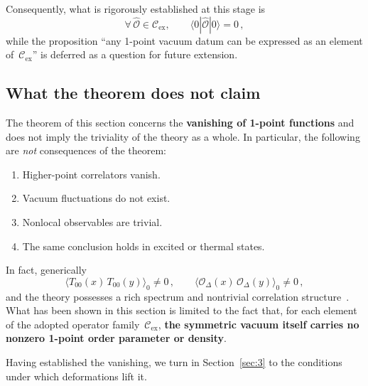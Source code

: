 \documentclass[
  aps,
  prd,
  preprint,
  groupedaddress,
  nofootinbib,
  longbibliography
]{revtex4-2}
\theoremstyle{remark}
\newcommand{\Cex}{\mathcal{C}_{\mathrm{ex}}}
\begin{document}
Consequently, what is rigorously established at this stage is
\begin{equation}\label{eq:established}
  \forall\,\hat{\mathcal{O}}\in\Cex,\qquad
  \langle 0|\hat{\mathcal{O}}|0\rangle = 0\,,
\end{equation}
while the proposition ``any 1-point vacuum datum can be expressed
as an element of~$\Cex$'' is deferred as a question for future
extension.

\subsection{What the theorem does not claim}\label{subsec:2-8}

The theorem of this section concerns the \textbf{vanishing of
1-point functions} and does not imply the triviality of the
theory as a whole.
In particular, the following are \emph{not} consequences of the
theorem:

\begin{enumerate}
\item Higher-point correlators vanish.
\item Vacuum fluctuations do not exist.
\item Nonlocal observables are trivial.
\item The same conclusion holds in excited or thermal states.
\end{enumerate}

In fact, generically
\begin{equation}\label{eq:2pt-nonzero}
  \langle T_{00}(x)\,T_{00}(y)\rangle_0 \neq 0\,,\qquad
  \langle\mathcal{O}_\Delta(x)\,
    \mathcal{O}_\Delta(y)\rangle_0 \neq 0\,,
\end{equation}
and the theory possesses a rich spectrum and nontrivial correlation
structure~\cite{ref5,ref13,ref14}.
What has been shown in this section is limited to the fact that,
for each element of the adopted operator family~$\Cex$,
\textbf{the symmetric vacuum itself carries no nonzero 1-point
order parameter or density}.

Having established the vanishing, we turn in
Section~\ref{sec:3} to the conditions under which
deformations lift it.

\end{document}
